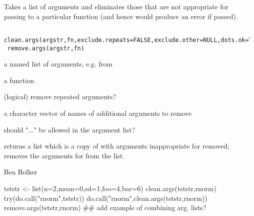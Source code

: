 \begin{Description}\relax
Takes a list of arguments and eliminates those that are not
appropriate for passing to a particular function (and hence
would produce an error if passed).
\end{Description}
\begin{Usage}
\begin{verbatim}
 clean.args(argstr,fn,exclude.repeats=FALSE,exclude.other=NULL,dots.ok=TRUE)
 remove.args(argstr,fn)
\end{verbatim}
\end{Usage}
\begin{Arguments}
\begin{ldescription}
\item[\code{argstr}] a named list of arguments, e.g. from \samp{\dots}
\item[\code{fn}] a function
\item[\code{exclude.repeats}] (logical) remove repeated arguments?
\item[\code{exclude.other}] a character vector of names of additional arguments to remove
\item[\code{dots.ok}] should "..." be allowed in the argument list?
\end{ldescription}
\end{Arguments}
\begin{Value}
 returns a list which is a copy of  with
arguments inappropriate for  removed; 
removes the arguments for  from the list.
\end{Value}
\begin{Author}\relax
Ben Bolker
\end{Author}
\begin{Examples}
\begin{ExampleCode}
 tststr <- list(n=2,mean=0,sd=1,foo=4,bar=6) 
 clean.args(tststr,rnorm)
 try(do.call("rnorm",tststr))
 do.call("rnorm",clean.args(tststr,rnorm))
 remove.args(tststr,rnorm)
 ## add example of combining arg. lists?
\end{ExampleCode}
\end{Examples}

